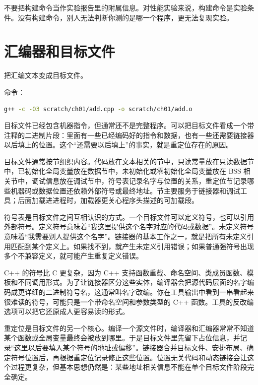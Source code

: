 \begin{warningbox}
不要把构建命令当作实验报告里的附属信息。对性能实验来说，构建命令是实验条件。没有构建命令，别人无法判断你测的是哪一个程序，更无法复现实验。
\end{warningbox}

\section{汇编器和目标文件}

 把汇编文本变成目标文件。

命令：

\begin{lstlisting}[language=bash]
g++ -c -O3 scratch/ch01/add.cpp -o scratch/ch01/add.o
\end{lstlisting}

目标文件已经包含机器指令，但通常还不是完整程序。可以把目标文件看成一个带注释的二进制片段：里面有一些已经编码好的指令和数据，也有一些还需要链接器以后填上的位置。这个“还需要以后填上”的事实，就是重定位存在的原因。

目标文件通常按节组织内容。代码放在文本相关的节中，只读常量放在只读数据节中，已初始化全局变量放在数据节中，未初始化或零初始化全局变量放在 BSS 相关节中，调试信息放在调试节中，符号表记录名字与位置的关系，重定位节记录哪些机器码或数据位置还依赖外部符号或最终地址。节主要服务于链接器和调试工具；后面加载进进程时，加载器更关心程序头描述的可加载段。

符号表是目标文件之间互相认识的方式。一个目标文件可以定义符号，也可以引用外部符号。定义符号意味着“我这里提供这个名字对应的代码或数据”。未定义符号意味着“我需要别人提供这个名字”。链接器的基本工作之一，就是把所有未定义引用匹配到某个定义上。如果找不到，就产生未定义引用错误；如果普通强符号出现多个不兼容定义，就可能产生重复定义错误。

C++ 的符号比 C 更复杂，因为 C++ 支持函数重载、命名空间、类成员函数、模板和不同调用形式。为了让链接器区分这些实体，编译器会把源代码层面的名字编码成更详细的二进制符号名，这通常叫名字改编。你在工具输出中看到一串看起来很难读的符号，可能只是一个带命名空间和参数类型的 C++ 函数。工具的反改编选项可以把它还原成人更容易读的形式。

重定位是目标文件的另一个核心。编译一个源文件时，编译器和汇编器常常不知道某个函数或全局变量最终会被放到哪里。于是目标文件里先留下占位信息，并记录“这里以后要填入某个符号的地址或偏移”。链接器合并目标文件、安排布局、确定符号位置后，再根据重定位记录修正这些位置。位置无关代码和动态链接会让这个过程更复杂，但基本思想仍然是：某些地址相关信息不能在单个目标文件阶段完全确定。

